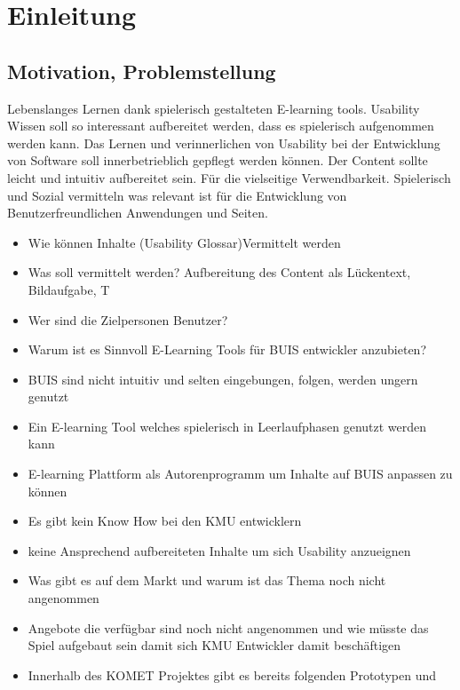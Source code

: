 \documentclass[a4paper, 12pt, twoside, BCOR=20mm, DIV=calc, abstracton, parskip=half*, toc=bibliography, toc=listof, headsepline, headings=small, numbers=enddot]{scrreprt} %
\begin{document}

%

\tableofcontents
\listoffigures

\chapter{Einleitung}\label{Einleitung}
\section{Motivation, Problemstellung}
Lebenslanges Lernen dank spielerisch gestalteten E-learning tools. Usability Wissen soll so interessant aufbereitet werden, dass es spielerisch aufgenommen werden kann. Das Lernen und verinnerlichen von Usability bei der Entwicklung von Software soll innerbetrieblich gepflegt werden können. 
Der Content sollte leicht und intuitiv aufbereitet sein. Für die vielseitige Verwendbarkeit. Spielerisch und Sozial vermitteln was relevant ist für die Entwicklung von Benutzerfreundlichen Anwendungen und Seiten.



\begin{itemize}

\item Wie können Inhalte (Usability Glossar)Vermittelt werden
\item Was soll vermittelt werden? Aufbereitung des Content als Lückentext, Bildaufgabe, T
\item Wer sind die Zielpersonen Benutzer?
\item Warum ist es Sinnvoll E-Learning Tools für BUIS entwickler anzubieten?
\item BUIS sind nicht intuitiv und selten eingebungen, folgen, werden ungern genutzt
\item Ein E-learning Tool welches spielerisch in Leerlaufphasen genutzt werden kann
\item E-learning Plattform als Autorenprogramm um Inhalte auf BUIS anpassen zu können
\item Es gibt kein Know How bei den KMU entwicklern
\item keine Ansprechend aufbereiteten Inhalte um sich Usability anzueignen
\item Was gibt es auf dem Markt und warum ist das Thema noch nicht angenommen
\item Angebote die verfügbar sind noch nicht angenommen und wie müsste das Spiel aufgebaut sein damit sich KMU Entwickler damit beschäftigen
\item Innerhalb des KOMET Projektes gibt es bereits folgenden Prototypen und 
\end{itemize}
\end{document}
